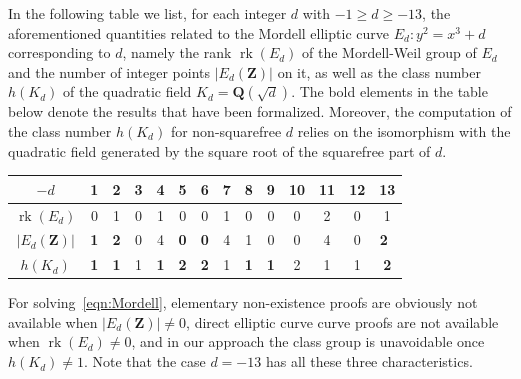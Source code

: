 \documentclass[sigplan,10pt,nonacm,
screen]{acmart} \settopmatter{printfolios=true,printccs=false,printacmref=false}
\newcommand{\ab}[1]{\todo[color=green]{AB: #1}}
\newcommand{\QQ}{\mathbf{Q}}
\newcommand{\ZZ}{\mathbf{Z}}
\DeclareMathOperator{\rk}{rk}
\begin{document}
In the following table we list, for each integer $d$ with $-1 \geq d \geq -13$, the aforementioned quantities related to the Mordell elliptic curve $E_d : y^2 = x^3 + d$ corresponding to $d$, namely the rank $\rk(E_d)$ of the Mordell-Weil group of $E_d$ and the number of integer points $|E_d(\ZZ)|$ on it, as well as the class number $h(K_d)$ of the quadratic field $K_d=\QQ(\sqrt{d})$.
The bold elements in the table below denote the results that have been formalized.
Moreover, the computation of the class number $h(K_d)$ for non-squarefree $d$ relies on the isomorphism with the quadratic field generated by the square root of the squarefree part of $d$.
\begin{center}
	\tabcolsep=0.15cm
	\begin{tabular}{c|c|c|c|c|c|c|c|c|c|c|c|c|c}
		$-d$          & 1                         & 2                         & 3 & 4 & 5                         & 6                         & 7 & 8 & 9 & 10 & 11 & 12 & 13                    \\ \hline
		$\rk(E_d)$     & 0                         & 1                         & 0 & 1 & 0                         & 0                         & 1 & 0 & 0 & 0  & 2  & 0  & 1              \\ \hline
		$|E_d(\ZZ)| $ & \textbf{1}                         & \textbf{2}                         & 0 & 4 & \textbf{0}                         & \textbf{0}                         & 4 & 1 & 0 & 0  & 4  & 0  & \textbf{2}\   \\ \hline
		$h(K_d)$      & \textbf{1}                         & \textbf{1}                         & 1 & \textbf{1} & \textbf{2}                         & \textbf{2}                         & 1 & \textbf{1} & \textbf{1} & 2  & 1  & 1  & \textbf{2}            \\
	\end{tabular}
\end{center}
For solving~\eqref{eqn:Mordell}, elementary non-existence proofs are obviously not available when $|E_d(\ZZ)|\not=0$, direct elliptic curve curve proofs are not available when $\rk(E_d)\not=0$, and in our approach the class group is unavoidable once $h(K_d)\not=1$.
Note that the case $d=-13$ has all these three characteristics.
\end{document}
